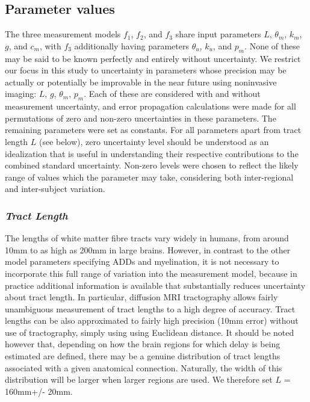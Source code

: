 \subsection{Parameter values}

The three measurement models $f_{1}$, $f_{2}$, and $f_{3}$ share input parameters
$L$, $\theta_{m}$, $k_{m}$, $g$, and $c_{m}$, with $f_{3}$ additionally
having parameters $\theta_{u}$, $k_{u}$, and $p_{m}$. None of these may
be said to be known perfectly and entirely without uncertainty. We restrict our focus in this study to uncertainty in parameters whose precision may be actually or potentially be improvable in the near future using noninvasive imaging: $L$, $g$, $\theta_{m}$, $p_{m}$. Each of these are considered with and without measurement uncertainty, and error propagation calculations were made for all permutations of zero and non-zero uncertainties in these parameters. The remaining parameters were set as constants. For all parameters apart from tract length $L$ (see below), zero uncertainty level should be understood as an idealization that is useful in understanding their respective contributions to the combined standard uncertainty. Non-zero levels were chosen to reflect the likely range of values which the parameter may take, considering both inter-regional and inter-subject variation.


\subsubsection*{\textit{Tract Length}}

The lengths of white matter fibre tracts vary widely in humans, from around 10mm to as high as 200mm in large brains. However, in contrast to the other model parameters specifying ADDs and myelination, it is not necessary to incorporate this full range of variation into the measurement model, because in practice additional information is available that substantially reduces uncertainty about tract length. In particular, diffusion MRI tractography allows fairly unambiguous measurement of tract lengths to a high degree of accuracy. Tract lengths can be also approximated to fairly high precision (10mm error) without use of tractography, simply using using Euclidean distance. It should be noted however that, depending on how the brain regions for which delay is being estimated are defined, there may be a genuine distribution of tract lengths associated with a given anatomical connection. Naturally, the width of this distribution will be larger when larger regions are used. We therefore set $L$ = 160mm+/- 20mm.

